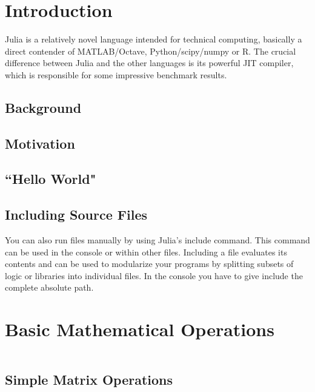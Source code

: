 
\tableofcontents
\section{Introduction}

Julia is a relatively novel language intended for technical computing, basically a direct contender of MATLAB/Octave, Python/scipy/numpy or R. The crucial difference between Julia and the other languages is its powerful JIT compiler, which is responsible for some impressive benchmark results. 
\subsection{Background}

\subsection{Motivation}

\subsection{``Hello World"}

\subsection{Including Source Files}

You can also run files manually by using Julia's include command. This command can be used in the console or within other files. Including a file evaluates its contents and can be used to modularize your programs by splitting subsets of logic or libraries into individual files. 
In the console you have to give include the complete absolute path. 
\newpage
\section{Basic Mathematical Operations}

\begin{framed}
\begin{verbatim}

\end{verbatim}
\end{framed}
\subsection{Simple Matrix Operations}

